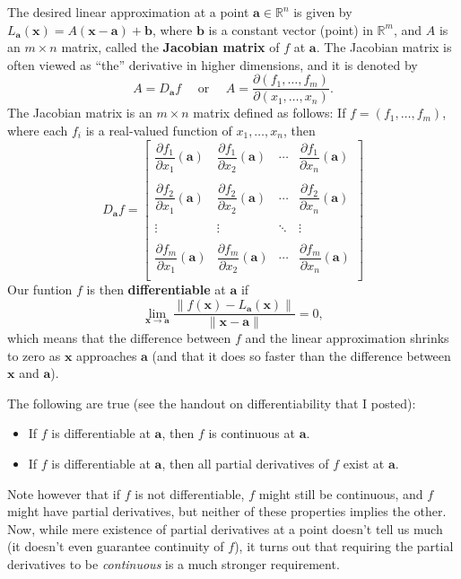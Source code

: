 \documentclass[letterpaper,12pt]{article}
\newcommand{\R}{\mathbb{R}}
\begin{document}
The desired linear approximation at a point $\mathbf{a}\in\R^n$ is given by $L_{\mathbf{a}}(\mathbf{x}) = A(\mathbf{x}-\mathbf{a})+\mathbf{b}$, where $\mathbf{b}$ is a constant vector (point) in $\R^m$, and $A$ is an $m\times n$ matrix, called the {\bf Jacobian matrix} of $f$ at $\mathbf{a}$. The Jacobian matrix is often viewed as ``the'' derivative in higher dimensions, and it is denoted by
\[
 A = D_{\mathbf{a}}f \quad \text{ or } \quad A = \frac{\partial(f_1,\ldots, f_m)}{\partial (x_1,\ldots, x_n)}.
\]
The Jacobian matrix is an $m\times n$ matrix defined as follows: If $f=(f_1,\ldots, f_m)$, where each $f_i$ is a real-valued function of $x_1,\ldots, x_n$, then
\[
 D_{\mathbf{a}}f = \begin{bmatrix}
                    \dfrac{\partial f_1}{\partial x_1}(\mathbf{a}) & \dfrac{\partial f_1}{\partial x_2}(\mathbf{a}) & \cdots & \dfrac{\partial f_1}{\partial x_n}(\mathbf{a})\\
 & & & \\
                    \dfrac{\partial f_2}{\partial x_1}(\mathbf{a}) & \dfrac{\partial f_2}{\partial x_2}(\mathbf{a}) & \cdots & \dfrac{\partial f_2}{\partial x_n}(\mathbf{a})\\
 & & & \\
 \vdots & \vdots & \ddots & \vdots \\

 & & & \\
                    \dfrac{\partial f_m}{\partial x_1}(\mathbf{a}) & \dfrac{\partial f_m}{\partial x_2}(\mathbf{a}) & \cdots & \dfrac{\partial f_m}{\partial x_n}(\mathbf{a})\\
                   \end{bmatrix}
\]
Our funtion $f$ is then {\bf differentiable} at $\mathbf{a}$ if
\[
 \lim_{\mathbf{x}\to\mathbf{a}}\frac{\lVert f(\mathbf{x}) - L_{\mathbf{a}}(\mathbf{x})\rVert}{\lVert \mathbf{x}-\mathbf{a}\rVert} = 0,
\]
which means that the difference between $f$ and the linear approximation shrinks to zero as $\mathbf{x}$ approaches $\mathbf{a}$ (and that it does so faster than the difference between $\mathbf{x}$ and $\mathbf{a}$).

The following are true (see the handout on differentiability that I posted):
\begin{itemize}
 \item If $f$ is differentiable at $\mathbf{a}$, then $f$ is continuous at $\mathbf{a}$.
 \item If $f$ is differentiable at $\mathbf{a}$, then all partial derivatives of $f$ exist at $\mathbf{a}$.
\end{itemize}
Note however that if $f$ is not differentiable, $f$ might still be continuous, and $f$ might have partial derivatives, but neither of these properties implies the other. Now, while mere existence of partial derivatives at a point doesn't tell us much (it doesn't even guarantee continuity of $f$), it turns out that requiring the partial derivatives to be {\em continuous} is a much stronger requirement.
\end{document}
